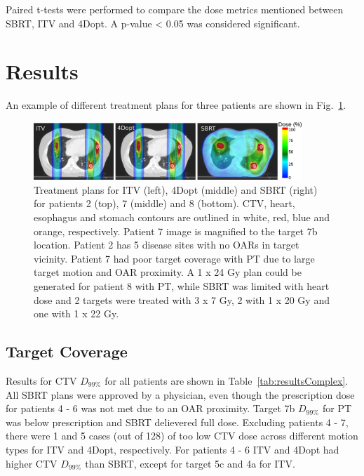 \documentclass[type=dr, dr=rernat, accentcolor=tud7b,colorbacktitle, bigchapter, openright, twoside, 12pt ]{tudthesis}
\begin{document}
Paired t-tests were performed to compare the dose metrics mentioned between SBRT, ITV and 4Dopt. A p-value < 0.05 was considered significant. 

\section{Results}

An example of different treatment plans for three patients are shown in Fig.~\ref{Fig:multiExample}. 

\newpage
\begin{figure}[H]
	\begin{center}
		\includegraphics[width=0.9\textwidth]{./Images/multiExample.png}
		\caption{Treatment plans for ITV (left), 4Dopt (middle) and SBRT (right) for patients 2 (top), 7 (middle) and 8 (bottom). 
		CTV, heart, esophagus and stomach contours are outlined in white, red, blue and orange,
		respectively. Patient 7 image is magnified to the target 7b location. Patient 2 has 5 disease sites with no OARs in target vicinity. Patient 7 had poor target coverage
		with PT due to large target motion and OAR proximity. A 1 x 24 Gy plan could be generated for patient 8 with PT, 
		while SBRT was limited with heart dose and 2 targets were treated with 3 x 7 Gy, 2 with 1 x 20 Gy and one with 1 x 22 Gy. }
		\label{Fig:multiExample}
	\end{center}
\end{figure}
\newpage
\subsection{Target Coverage}

Results for CTV $D_{99\%}$ for all patients are shown in Table~\ref{tab:resultsComplex}. All SBRT plans were approved by a physician, 
even though the prescription dose for patients 4 - 6 was not met due to an OAR proximity. Target 7b $D_{99\%}$ for PT was below prescription and SBRT delievered full dose.
Excluding patients 4 - 7, there were 1 and 5 cases (out of 128) of too low CTV dose across different
motion types for ITV and 4Dopt, respectively. For patients 4 - 6 ITV and 4Dopt had higher CTV $D_{99\%}$ than SBRT, except for target 5c and 4a for ITV.
\end{document}
